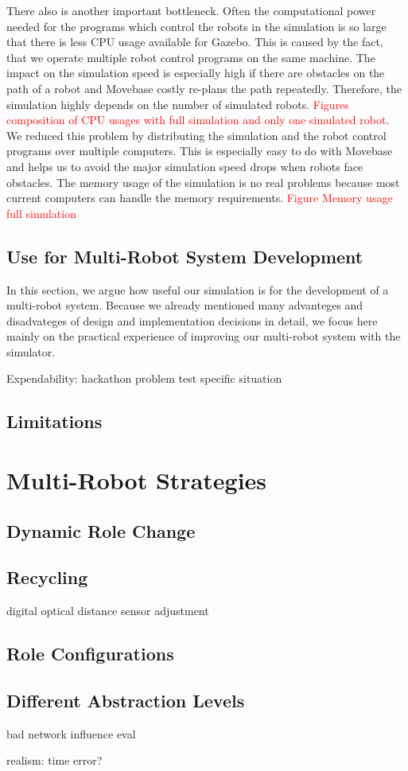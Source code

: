 There also is another important bottleneck. Often the computational power needed for the programs which control the robots in the simulation is so large that there is less CPU usage available for Gazebo. This is caused by the fact, that we operate multiple robot control programs on the same machine. The impact on the simulation speed is especially high if there are obstacles on the path of a robot and Movebase costly re-plans the path repeatedly. Therefore, the simulation highly depends on the number of simulated robots. \textcolor{red}{Figures composition of CPU usages with full simulation and only one simulated robot}. We reduced this problem by distributing the simulation and the robot control programs over multiple computers. This is especially easy to do with Movebase and helps us to avoid the major simulation speed drops when robots face obstacles.
The memory usage of the simulation is no real problems because most current computers can handle the memory requirements. \textcolor{red}{Figure Memory usage full simulation}

\subsection{Use for Multi-Robot System Development}
In this section, we argue how useful our simulation is for the development of a multi-robot system. Because we already mentioned many advanteges and disadvateges of design and implementation decisions in detail, we focus here mainly on the practical experience of improving our multi-robot system with the simulator. 

Expendability: hackathon
problem test specific situation
\subsection{Limitations}

\section{Multi-Robot Strategies}
\label{sec:multi_robot_strategies}
\subsection{Dynamic Role Change}
\subsection{Recycling}
digital optical distance sensor adjustment
\subsection{Role Configurations}
\subsection{Different Abstraction Levels}
bad network influence eval




realism: time error?

